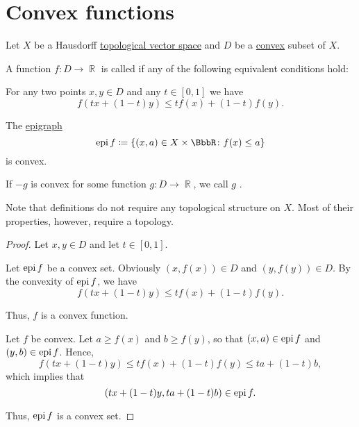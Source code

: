 \section{Convex functions}\label{sec:convex_functions}

Let \( X \) be a Hausdorff \hyperref[def:topological_vector_space]{topological vector space} and \( D \) be a \hyperref[def:convex_hull]{convex} subset of \( X \).

\begin{definition}\label{def:convex_function}
  A function \( f: D \to \BbbR \) is called  if any of the following equivalent conditions hold:

  \begin{thmenum}
     For any two points \( x, y \in D \) and any \( t \in [0, 1] \) we have
    \begin{equation*}
      f(tx + (1-t)y) \leq tf(x) + (1-t)f(y).
    \end{equation*}

     The \hyperref[def:epigraph]{epigraph}
    \begin{equation*}
      \epi f \coloneqq \{ (x, a) \in X \times \BbbR \colon f(x) \leq a \}
    \end{equation*}
    is convex.
  \end{thmenum}

  If \( -g \) is convex for some function \( g: D \to \BbbR \), we call \( g \) .

  Note that definitions do not require any topological structure on \( X \). Most of their properties, however, require a topology.
\end{definition}
\begin{proof}
  Let \( x, y \in D \) and let \( t \in [0, 1] \).

   Let \( \operatorname{epi} f \) be a convex set. Obviously \( (x, f(x)) \in D \) and \( (y, f(y)) \in D \). By the convexity of \( \operatorname{epi} f \), we have
  \begin{equation*}
    f(tx + (1-t)y) \leq tf(x) + (1-t)f(y).
  \end{equation*}

  Thus, \( f \) is a convex function.

   Let \( f \) be convex. Let \( a \geq f(x) \) and \( b \geq f(y) \), so that \( (x, a) \in \operatorname{epi} f \) and \( (y, b) \in \operatorname{epi} f \). Hence,
  \begin{equation*}
    f(tx + (1-t)y) \leq tf(x) + (1-t)f(y) \leq ta + (1-t)b,
  \end{equation*}
  which implies that
  \begin{equation*}
    (tx + (1-t)y, ta + (1-t)b) \in \operatorname{epi} f.
  \end{equation*}

  Thus, \( \operatorname{epi} f \) is a convex set.
\end{proof}

